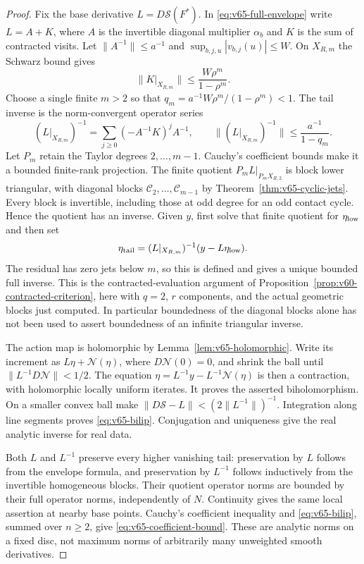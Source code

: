 \begin{proof}
Fix the base derivative $L=D\mathcal S(F^*)$.  In
\eqref{eq:v65-full-envelope} write $L=A+K$, where $A$ is the
invertible diagonal multiplier $\alpha_b$ and $K$ is the sum of
contracted visits.  Let $\|A^{-1}\|\le a^{-1}$ and
$\sup_{b,j,u}|v_{b,j}(u)|\le W$.  On $X_{R,m}$ the Schwarz bound
gives
\[
 \|K|_{X_{R,m}}\|\le\frac{W\rho^m}{1-\rho^m}.
\]
Choose a single finite $m>2$ so that
$q_m=a^{-1}W\rho^m/(1-\rho^m)<1$.
The tail inverse is the norm-convergent operator series
\[
 (L|_{X_{R,m}})^{-1}
       =\sum_{j\ge0}(-A^{-1}K)^jA^{-1},\qquad
 \|(L|_{X_{R,m}})^{-1}\|\le\frac{a^{-1}}{1-q_m}.
\]
Let $P_m$ retain the Taylor degrees $2,\ldots,m-1$.
Cauchy's coefficient bounds make it a bounded finite-rank projection.
The finite quotient $P_mL|_{P_mX_{R,2}}$ is block lower triangular,
with diagonal blocks $\mathcal C_2,\ldots,\mathcal C_{m-1}$ by
Theorem~\ref{thm:v65-cyclic-jets}.  Every block is invertible, including
those at odd degree for an odd contact cycle.  Hence the quotient has
an inverse.  Given $y$, first solve that finite quotient for
$\eta_{\rm low}$ and then set
\[
 \eta_{\rm tail}=(L|_{X_{R,m}})^{-1}(y-L\eta_{\rm low}).
\]
The residual has zero jets below $m$, so this is defined and gives a
unique bounded full inverse.  This is the contracted-evaluation argument
of Proposition~\ref{prop:v60-contracted-criterion}, here with $q=2$,
$r$ components, and the actual geometric blocks just computed.  In
particular boundedness of the diagonal blocks alone has not been used
to assert boundedness of an infinite triangular inverse.

The action map is holomorphic by Lemma~\ref{lem:v65-holomorphic}.
Write its increment as $L\eta+\mathcal N(\eta)$, where
$D\mathcal N(0)=0$, and shrink the ball until
$\|L^{-1}D\mathcal N\|<1/2$.  The equation
$\eta=L^{-1}y-L^{-1}\mathcal N(\eta)$ is then a contraction,
with holomorphic locally uniform iterates.  It proves the asserted
biholomorphism.  On a smaller convex ball make
$\|D\mathcal S-L\|<(2\|L^{-1}\|)^{-1}$.
Integration along line segments proves \eqref{eq:v65-bilip}.
Conjugation and uniqueness give the real analytic inverse for real data.

Both $L$ and $L^{-1}$ preserve every higher vanishing tail: preservation
by $L$ follows from the envelope formula, and preservation by $L^{-1}$
follows inductively from the invertible homogeneous blocks.  Their
quotient operator norms are bounded by their full operator norms,
independently of $N$.  Continuity gives the same local assertion at
nearby base points.  Cauchy's coefficient inequality and
\eqref{eq:v65-bilip}, summed over $n\ge2$, give
\eqref{eq:v65-coefficient-bound}.  These are analytic norms on a fixed
disc, not maximum norms of arbitrarily many unweighted smooth derivatives.
\end{proof}

